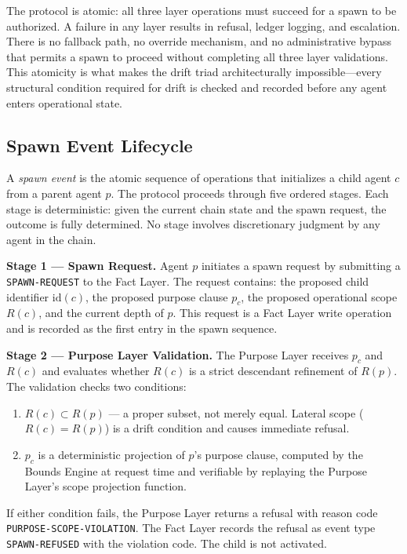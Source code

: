 The protocol is atomic: all three layer operations must succeed for a spawn to be authorized. A failure in any layer results in refusal, ledger logging, and escalation. There is no fallback path, no override mechanism, and no administrative bypass that permits a spawn to proceed without completing all three layer validations. This atomicity is what makes the drift triad architecturally impossible—every structural condition required for drift is checked and recorded before any agent enters operational state.

\subsection{Spawn Event Lifecycle}

A \emph{spawn event} is the atomic sequence of operations that initializes a child agent $c$ from a parent agent $p$. The protocol proceeds through five ordered stages. Each stage is deterministic: given the current chain state and the spawn request, the outcome is fully determined. No stage involves discretionary judgment by any agent in the chain.

\bigskip
\noindent\textbf{Stage 1 — Spawn Request.} Agent $p$ initiates a spawn request by submitting a \texttt{SPAWN-REQUEST} to the Fact Layer. The request contains: the proposed child identifier $\mathrm{id}(c)$, the proposed purpose clause $p_c$, the proposed operational scope $R(c)$, and the current depth of $p$. This request is a Fact Layer write operation and is recorded as the first entry in the spawn sequence.

\bigskip
\noindent\textbf{Stage 2 — Purpose Layer Validation.} The Purpose Layer receives $p_c$ and $R(c)$ and evaluates whether $R(c)$ is a strict descendant refinement of $R(p)$. The validation checks two conditions:

\begin{enumerate}
  \item[(PL-V1)] $R(c) \subset R(p)$ --- a proper subset, not merely equal. Lateral scope ($R(c) = R(p)$) is a drift condition and causes immediate refusal.
  \item[(PL-V2)] $p_c$ is a deterministic projection of $p$'s purpose clause, computed by the Bounds Engine at request time and verifiable by replaying the Purpose Layer's scope projection function.
\end{enumerate}

If either condition fails, the Purpose Layer returns a refusal with reason code \texttt{PURPOSE-SCOPE-VIOLATION}. The Fact Layer records the refusal as event type \texttt{SPAWN-REFUSED} with the violation code. The child is not activated.

